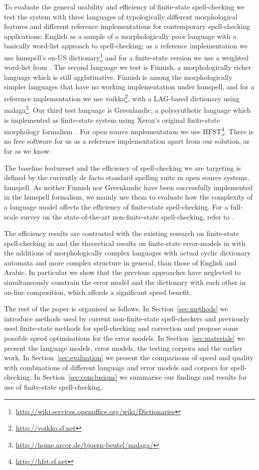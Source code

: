 \documentclass[11pt]{article}
\begin{document}
To evaluate the general usability and efficiency of finite-state spell-checking we
test the system with three languages of typologically different morphological
features and different reference implementations for contemporary
spell-checking applications: English as a sample of a morphologically
poor language with a basically word-list approach to spell-checking; as a
reference implementation we use hunspell's en-US
dictionary\footnote{\url{http://wiki.services.openoffice.org/wiki/Dictionaries}}
and for a finite-state version we use a weighted word-list
from . The second language we test is Finnish, a
morphologically richer language which is still agglutinative. Finnish is
among the morphologically simpler languages that have no working implementation
under hunspell, and for a reference implementation we use
voikko\footnote{\url{http://voikko.sf.net}}, with a LAG-based dictionary using
malaga\footnote{\url{http://home.arcor.de/bjoern-beutel/malaga/}}. Our third
test language is Greenlandic, a polysynthetic language which is implemented as
finite-state system using Xerox's original finite-state morphology
formalism~\cite{beesley/2003}. For open source implementation we use
HFST\footnote{\url{http://hfst.sf.net}}. There is no free software for
us as a reference implementation apart from our solution, as far as we know.

The baseline featureset and the efficiency of spell-checking we are targeting
is defined by the currently de facto standard spelling suite in open source
systems, hunspell. As neither Finnish nor Greenlandic have been successfully
implemented in the hunspell formalism, we mainly use them to evaluate how
the complexity of a language model affects the efficiency of finite-state
spell-checking. For a full-scale survey on the state-of-the-art
non-finite-state spell-checking, refer to .

The efficiency results are contrasted with the existing research on
finite-state spell-checking in  and the theoretical
results on finite-state error-models in  with the
additions of morphologically complex languages with actual cyclic
dictionary automata and more complex structure in general, than those of
English and Arabic. In particular we show that the previous approaches have
neglected to simultaneously constrain the error model and the dictionary with
each other in on-line composition, which affords a significant speed benefit.

The rest of the paper is organised as follows. In Section~\ref{sec:methods} we
introduce methods used by current non-finite-state spell-checkers and
previously used finite-state methods for spell-checking and correction and
propose some possible speed optimisations for the error models. In
Section~\ref{sec:materials} we present the language models, error models, the
testing corpora and the earlier work. In Section~\ref{sec:evaluation} we
present the comparisons of speed and quality with combinations of different
language and error models and corpora for spell-checking. In
Section~\ref{sec:conclusions} we summarise our findings and results for use
of finite-state spell-checking.
\end{document}
